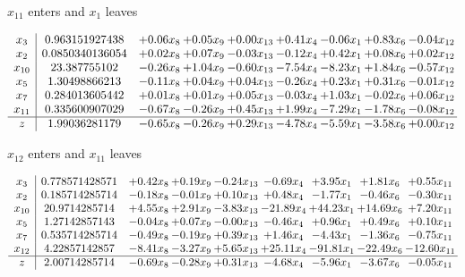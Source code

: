\documentclass[9pt]{article}
\begin{document}
 $ x_{11} $ enters and $ x_{1} $ leaves 

 \[\begin{array}{c| c c@{\hskip 2pt} c@{\hskip 2pt} c@{\hskip 2pt} c@{\hskip 2pt} c@{\hskip 2pt} c@{\hskip 2pt} c@{\hskip 2pt} }
 x_{3}   &  0.963151927438 & +  0.06 x_{8} & +  0.05 x_{9} & +  0.00 x_{13} & +  0.41 x_{4} & -0.06 x_{1} & +  0.83 x_{6} & -0.04 x_{12}\\
 x_{2}   &  0.0850340136054 & +  0.02 x_{8} & +  0.07 x_{9} & -0.03 x_{13} & -0.12 x_{4} & +  0.42 x_{1} & +  0.08 x_{6} & +  0.02 x_{12}\\
 x_{10}   &  23.387755102 & -0.26 x_{8} & +  1.04 x_{9} & -0.60 x_{13} & -7.54 x_{4} & -8.23 x_{1} & +  1.84 x_{6} & -0.57 x_{12}\\
 x_{5}   &  1.30498866213 & -0.11 x_{8} & +  0.04 x_{9} & +  0.04 x_{13} & -0.26 x_{4} & +  0.23 x_{1} & +  0.31 x_{6} & -0.01 x_{12}\\
 x_{7}   &  0.284013605442 & +  0.01 x_{8} & +  0.01 x_{9} & +  0.05 x_{13} & -0.03 x_{4} & +  1.03 x_{1} & -0.02 x_{6} & +  0.06 x_{12}\\
 x_{11}   &  0.335600907029 & -0.67 x_{8} & -0.26 x_{9} & +  0.45 x_{13} & +  1.99 x_{4} & -7.29 x_{1} & -1.78 x_{6} & -0.08 x_{12}\\
\hline
z    &  1.99036281179 & -0.65 x_{8} & -0.26 x_{9} & +  0.29 x_{13} & -4.78 x_{4} & -5.59 x_{1} & -3.58 x_{6} & +  0.00 x_{12}\\
\end{array}\]


 $ x_{12} $ enters and $ x_{11} $ leaves 

 \[\begin{array}{c| c c@{\hskip 2pt} c@{\hskip 2pt} c@{\hskip 2pt} c@{\hskip 2pt} c@{\hskip 2pt} c@{\hskip 2pt} c@{\hskip 2pt} }
 x_{3}   &  0.778571428571 & +  0.42 x_{8} & +  0.19 x_{9} & -0.24 x_{13} & -0.69 x_{4} & +  3.95 x_{1} & +  1.81 x_{6} & +  0.55 x_{11}\\
 x_{2}   &  0.185714285714 & -0.18 x_{8} & -0.01 x_{9} & +  0.10 x_{13} & +  0.48 x_{4} & -1.77 x_{1} & -0.46 x_{6} & -0.30 x_{11}\\
 x_{10}   &  20.9714285714 & +  4.55 x_{8} & +  2.91 x_{9} & -3.83 x_{13} & -21.89 x_{4} & + 44.23 x_{1} & + 14.69 x_{6} & +  7.20 x_{11}\\
 x_{5}   &  1.27142857143 & -0.04 x_{8} & +  0.07 x_{9} & -0.00 x_{13} & -0.46 x_{4} & +  0.96 x_{1} & +  0.49 x_{6} & +  0.10 x_{11}\\
 x_{7}   &  0.535714285714 & -0.49 x_{8} & -0.19 x_{9} & +  0.39 x_{13} & +  1.46 x_{4} & -4.43 x_{1} & -1.36 x_{6} & -0.75 x_{11}\\
 x_{12}   &  4.22857142857 & -8.41 x_{8} & -3.27 x_{9} & +  5.65 x_{13} & + 25.11 x_{4} & -91.81 x_{1} & -22.49 x_{6} & -12.60 x_{11}\\
\hline
z    &  2.00714285714 & -0.69 x_{8} & -0.28 x_{9} & +  0.31 x_{13} & -4.68 x_{4} & -5.96 x_{1} & -3.67 x_{6} & -0.05 x_{11}\\
\end{array}\]
\end{document}
